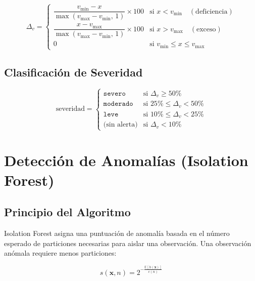 \documentclass[12pt, a4paper]{article}
\begin{document}
\begin{equation}
  \Delta_v =
  \begin{cases}
    \dfrac{v_{\min} - x}{\max(v_{\max} - v_{\min},\, 1)} \times 100 & \text{si } x < v_{\min} \quad (\text{deficiencia}) \\[1em]
    \dfrac{x - v_{\max}}{\max(v_{\max} - v_{\min},\, 1)} \times 100 & \text{si } x > v_{\max} \quad (\text{exceso}) \\[0.5em]
    0 & \text{si } v_{\min} \leq x \leq v_{\max}
  \end{cases}
  \label{eq:desviacion}
\end{equation}

\subsection{Clasificación de Severidad}

\begin{equation}
  \text{severidad} =
  \begin{cases}
    \texttt{severo}   & \text{si } \Delta_v \geq 50\% \\
    \texttt{moderado} & \text{si } 25\% \leq \Delta_v < 50\% \\
    \texttt{leve}     & \text{si } 10\% \leq \Delta_v < 25\% \\
    \text{(sin alerta)} & \text{si } \Delta_v < 10\%
  \end{cases}
  \label{eq:severidad}
\end{equation}

\section{Detección de Anomalías (Isolation Forest)}

\subsection{Principio del Algoritmo}

Isolation Forest asigna una puntuación de anomalía basada en el número esperado de particiones necesarias para aislar una observación. Una observación anómala requiere menos particiones:

\begin{equation}
  s(\mathbf{x}, n) = 2^{-\frac{\mathbb{E}[h(\mathbf{x})]}{c(n)}}
  \label{eq:iforest}
\end{equation}
\end{document}

